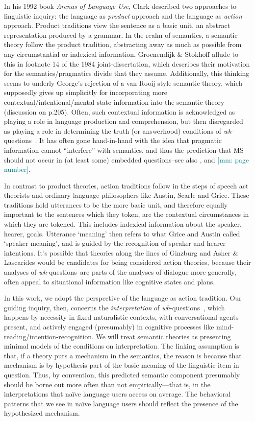 \documentclass[12pt,letterpaper,table,svgnames,dvipsnames]{article}
\newcommand{\mm}[1]{\textcolor{teal}{[mm: #1]}}
\newcommand{\whqs}{\emph{wh}-questions~}
\begin{document}
In his 1992 book \emph{Arenas of Language Use}, Clark described two approaches to linguistic inquiry: the language as \emph{product} approach and the language as \emph{action} approach. Product traditions view the sentence as a basic unit, an abstract representation produced by a grammar. In the realm of semantics, a semantic theory follow the product tradition, abstracting away as much as possible from any circumstantial or indexical information. Groenendijk \& Stokhoff allude to this in footnote 14 of the 1984 joint-dissertation, which describes their motivation for the semantics/pragmatics divide that they assume. Additionally, this thinking seems to underly George's rejection of a van Rooij style semantic theory, which supposedly gives up simplicitly for incorporating more contextual/intentional/mental state information into the semantic theory (discussion on p.205). Often, such contextual information is acknowledged as playing a role in language production and comprehension, but then disregarded as playing a role in determining the truth (or answerhood) conditions of \whqs. It has often gone hand-in-hand with the idea that pragmatic information cannot ``interfere'' with semantics, and thus the prediction that MS should not occur in (at least some) embedded questions--see also , and \cite{xiang2016}\mm{page number}.


In contrast to product theories, action traditions follow in the steps of speech act theorists and ordinary language philosophers like Austin, Searle and Grice. These traditions hold utterances to be the more basic unit, and therefore equally important to the sentences which they token, are the contextual circumstances in which they are tokened. This includes indexical information about the speaker, hearer, goals. Utterance `meaning' then refers to what Grice and Austin called `speaker meaning', and is guided by the recognition of speaker and hearer intentions. It's possible that theories along the lines of Ginzburg and Asher \& Lascarides would be candidates for being considered action theories, because their analyses of \whqs are parts of the analyses of dialogue more generally, often appeal to situational information like cognitive states and plans. 

In this work, we adopt the perspective of the language as action tradition. Our guiding inquiry, then, concerns the \emph{interpretation} of \whqs, which happens by necessity in fixed naturalistic contexts, with conversational agents present, and actively engaged (presumably) in cognitive processes like mind-reading/intention-recognition. We will treat semantic theories as presenting minimal models of the conditions on interpretation. The linking assumption is that, if a theory puts a mechanism in the semantics, the reason is because that mechanism is by hypothesis part of the basic meaning of the linguistic item in question. Thus, by convention, this predicted semantic component presumably should be borne out more often than not empirically---that is, in the interpretations that na\"ive language users access on average. The behavioral patterns that we see in na\"ive language users should reflect the presence of the hypothesized mechanism.
\end{document}
